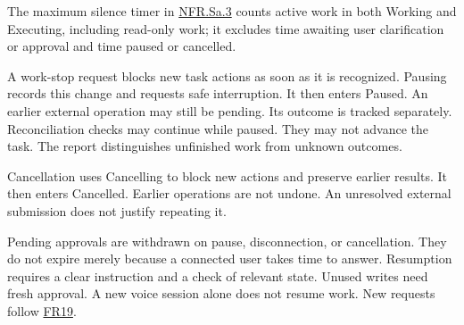 \documentclass{scrreprt}
\theoremstyle{definition}
\newcommand{\reqlink}[1]{\hyperlink{req:#1}{#1}}
\begin{document}
The maximum silence timer in \reqlink{NFR.Sa.3} counts active work in both Working and Executing, including read-only work; it excludes time awaiting user clarification or approval and time paused or cancelled.

A work-stop request blocks new task actions as soon as it is recognized. Pausing records this change and requests safe interruption. It then enters Paused. An earlier external operation may still be pending. Its outcome is tracked separately. Reconciliation checks may continue while paused. They may not advance the task. The report distinguishes unfinished work from unknown outcomes.

Cancellation uses Cancelling to block new actions and preserve earlier results. It then enters Cancelled. Earlier operations are not undone. An unresolved external submission does not justify repeating it.

Pending approvals are withdrawn on pause, disconnection, or cancellation. They do not expire merely because a connected user takes time to answer. Resumption requires a clear instruction and a check of relevant state. Unused writes need fresh approval. A new voice session alone does not resume work. New requests follow \reqlink{FR19}.
\end{document}
